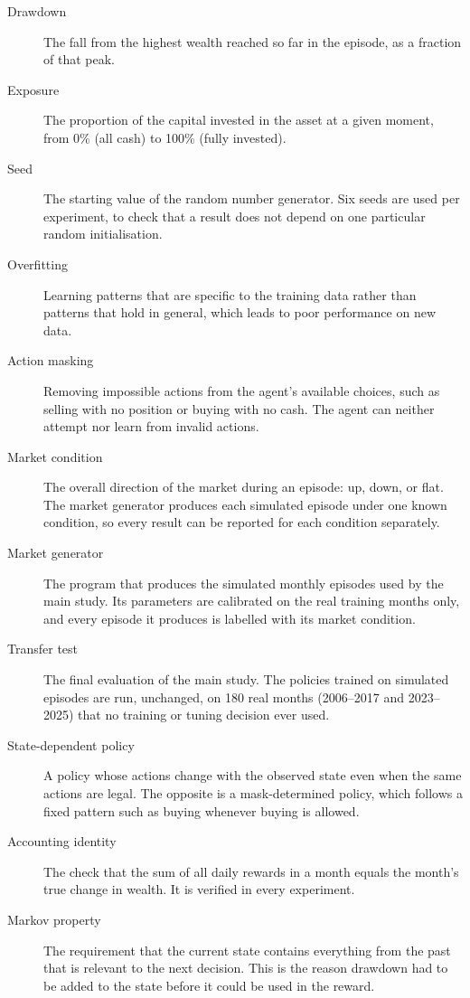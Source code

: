 \begin{description}
  \item[Drawdown] The fall from the highest wealth reached so far in the
  episode, as a fraction of that peak.

  \item[Exposure] The proportion of the capital invested in the asset at
  a given moment, from 0\% (all cash) to 100\% (fully invested).

  \item[Seed] The starting value of the random number generator. Six
  seeds are used per experiment, to check that a result does not depend
  on one particular random initialisation.

  \item[Overfitting] Learning patterns that are specific to the training
  data rather than patterns that hold in general, which leads to poor
  performance on new data.

  \item[Action masking] Removing impossible actions from the agent's
  available choices, such as selling with no position or buying with no
  cash. The agent can neither attempt nor learn from invalid actions.

  \item[Market condition] The overall direction of the market during an
  episode: up, down, or flat. The market generator produces each
  simulated episode under one known condition, so every result can be
  reported for each condition separately.

  \item[Market generator] The program that produces the simulated
  monthly episodes used by the main study. Its parameters are calibrated
  on the real training months only, and every episode it produces is
  labelled with its market condition.

  \item[Transfer test] The final evaluation of the main study. The
  policies trained on simulated episodes are run, unchanged, on 180 real
  months (2006--2017 and 2023--2025) that no training or tuning decision
  ever used.

  \item[State-dependent policy] A policy whose actions change with the
  observed state even when the same actions are legal. The opposite is a
  mask-determined policy, which follows a fixed pattern such as buying
  whenever buying is allowed.

  \item[Accounting identity] The check that the sum of all daily rewards
  in a month equals the month's true change in wealth. It is verified in
  every experiment.

  \item[Markov property] The requirement that the current state contains
  everything from the past that is relevant to the next decision. This
  is the reason drawdown had to be added to the state before it could be
  used in the reward.

\end{description}
